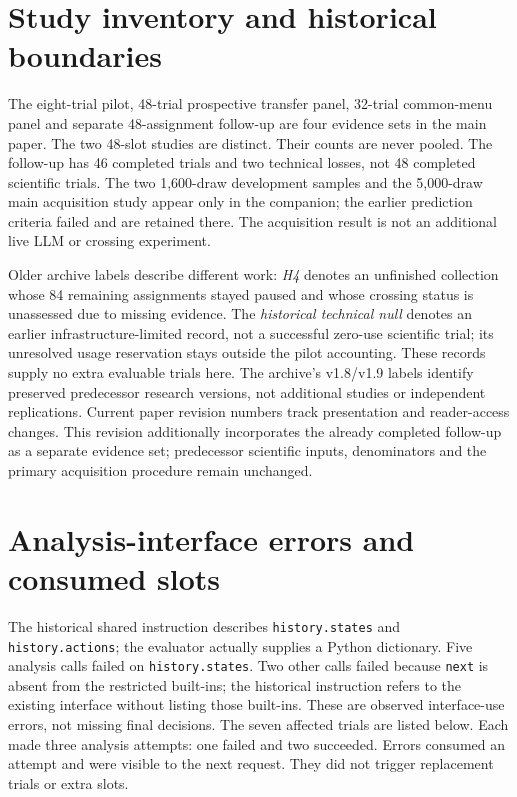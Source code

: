 \section{Study inventory and historical boundaries}
\label{app:inventory}
The eight-trial pilot, 48-trial prospective transfer panel, 32-trial
common-menu panel and separate 48-assignment follow-up are four evidence sets
in the main paper. The two 48-slot studies are distinct. Their counts are
never pooled. The follow-up has 46 completed trials and two technical losses,
not 48 completed scientific trials. The two 1,600-draw development samples and the
5,000-draw main acquisition study appear only in the companion; the earlier
prediction criteria failed and are retained there. The acquisition result
is not an additional live LLM or crossing experiment.

Older archive labels describe different work: \emph{H4} denotes an unfinished
collection whose 84 remaining assignments stayed paused and whose crossing
status is unassessed due to missing evidence. The \emph{historical technical
null} denotes an earlier infrastructure-limited record, not a successful
zero-use scientific trial; its unresolved usage reservation stays outside
the pilot accounting. These records supply no extra evaluable trials here.
The archive's v1.8/v1.9 labels identify preserved predecessor research
versions, not additional studies or independent replications. Current paper
revision numbers track presentation and reader-access changes. This revision
additionally incorporates the already completed follow-up as a separate
evidence set; predecessor scientific inputs, denominators and the primary
acquisition procedure remain unchanged.

\section{Analysis-interface errors and consumed slots}
\label{app:interface-audit}
The historical shared instruction describes \texttt{history.states} and
\texttt{history.actions}; the evaluator actually supplies a Python dictionary.
Five analysis calls failed on \texttt{history.states}. Two other calls failed
because \texttt{next} is absent from the restricted built-ins; the historical
instruction refers to the existing interface without listing those built-ins.
These are observed interface-use errors, not missing final decisions. The
seven affected trials are listed below. Each made three analysis attempts:
one failed and two succeeded. Errors consumed an attempt and were visible
to the next request. They did not trigger replacement trials or extra slots.

